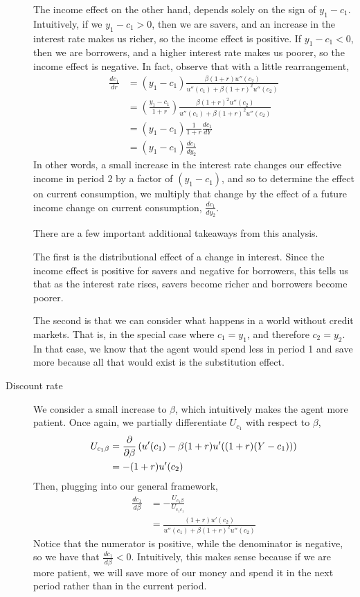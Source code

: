 \begin{description}
    The income effect on the other hand, depends solely on the sign of $y_1 - c_1$. Intuitively, if we $y_1 - c_1 > 0$, then we are savers, and an increase in the interest rate makes us richer, so the income effect is positive. If $y_1 - c_1 < 0$, then we are borrowers, and a higher interest rate makes us poorer, so the income effect is negative. In fact, observe that with a little rearrangement,
    \begin{align*}
        \frac{dc_1}{dr} &= (y_1 - c_1) \frac{\beta(1 + r) u''(c_2)}{u''(c_1) + \beta (1 + r)^2 u''(c_2)} \\
        &= \left(\frac{y_1 - c_1}{1 + r}\right) \frac{\beta(1 + r)^2 u''(c_2)}{u''(c_1) + \beta (1 + r)^2 u''(c_2)} \\
        &= (y_1 - c_1) \frac{1}{1 + r} \frac{dc_1}{dY} \\
        &= (y_1 - c_1) \frac{dc_1}{dy_2}
    \end{align*}
    In other words, a small increase in the interest rate changes our effective income in period 2 by a factor of $(y_1 - c_1)$, and so to determine the effect on current consumption, we multiply that change by the effect of a future income change on current consumption, $\frac{dc_1}{dy_2}$. 
    
    There are a few important additional takeaways from this analysis. 
    
    The first is the distributional effect of a change in interest. Since the income effect is positive for savers and negative for borrowers, this tells us that as the interest rate rises, savers become richer and borrowers become poorer. 

    The second is that we can consider what happens in a world without credit markets. That is, in the special case where $c_1 = y_1$, and therefore $c_2 = y_2$. In that case, we know that the agent would spend less in period 1 and save more because all that would exist is the substitution effect. 
    
    \item[Discount rate] We consider a small increase to $\beta$, which intuitively makes the agent more patient. Once again, we partially differentiate $U_{c_1}$ with respect to $\beta$,
    \begin{align*}
        U_{c_1 \beta} &= \frac{\partial }{\partial \beta} \left(u'(c_1) - \beta (1 + r) u'((1 + r)(Y - c_1))\right) \\
        &= -(1 + r) u'(c_2)
    \end{align*} 
    Then, plugging into our general framework,
    \begin{align*}
        \frac{dc_1}{d \beta} &= - \frac{U_{c_1 \beta} }{U_{c_1 c_1}} \\
        &= \frac{(1 + r)u'(c_2)}{u''(c_1) + \beta (1+r)^2 u''(c_2)}
    \end{align*}
    Notice that the numerator is positive, while the denominator is negative, so we have that $\frac{dc_1}{d\beta} < 0$. Intuitively, this makes sense because if we are more patient, we will save more of our money and spend it in the next period rather than in the current period. 
\end{description}

